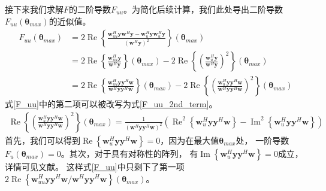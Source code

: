 \documentclass[master]{thesis-uestc}
\begin{document}
接下来我们求解$F$的二阶导数$F_{uu}$。为简化后续计算，我们此处导出二阶导数$F_{uu}(\bm{\theta}_{max})$的近似值。
\begin{equation}\label{F_uu}
    \begin{aligned}
        F_{uu}(\bm{\theta}_{max}) &= 2\operatorname{Re}
        \left\{\frac{\bm{w}^H_{uu}\bm{y}\bm{w}^H\bm{y}-\bm{w}^H_u\bm{y}\bm{w}^H_u\bm{y}}
        {\left( \bm{w}^H\bm{y} \right)^2}\right\}(\bm{\theta}_{max}) \\
        &= 2\operatorname{Re}\left\{\frac{\bm{w}^H_{uu}\bm{y}}{\bm{w}^H\bm{y}}\right\}(\bm{\theta}_{max}) - 
           2\operatorname{Re}\left\{\left(\frac{\bm{w}^H_{u}\bm{y}}{\bm{w}^H\bm{y}}\right)^2\right\}(\bm{\theta}_{max})
           \\
        &= 2\operatorname{Re}\left\{\frac{\bm{w}^H_{uu}\bm{y}\bm{y}^H\bm{w}}
                                    {\bm{w}^H\bm{y}\bm{y}^H\bm{w}}\right\}(\bm{\theta}_{max}) - 
           2\operatorname{Re}\left\{\left(\frac{\bm{w}^H_{u}\bm{y}\bm{y}^H\bm{w}}
                                    {\bm{w}^H\bm{y}\bm{y}^H\bm{w}}\right)^2\right\}(\bm{\theta}_{max})
    \end{aligned}
\end{equation}
式\eqref{F_uu}中的第二项可以被改写为式\eqref{F_uu_2nd_term}。
\begin{equation}\label{F_uu_2nd_term}
    \begin{aligned}
        \operatorname{Re}\left\{\left(\frac{\bm{w}^H_{u}\bm{y}\bm{y}^H\bm{w}}
                                {\bm{w}^H\bm{y}\bm{y}^H\bm{w}}\right)^2\right\}(\bm{\theta}_{max})
        = \frac{1}{\left(\bm{w}^H\bm{y}\bm{y}^H\bm{w}\right)^2}
          \left(\operatorname{Re}^2\left\{\bm{w}^H_{u}\bm{y}\bm{y}^H\bm{w}\right\}-
          \operatorname{Im}^2\left\{\bm{w}^H_{u}\bm{y}\bm{y}^H\bm{w}\right\}\right)
    \end{aligned}
\end{equation}
首先，我们可以得到$\operatorname{Re}\left\{\bm{w}^H_{u}\bm{y}\bm{y}^H\bm{w}\right\}=0$，因为在最大值$\bm{\theta}_{max}$处，
一阶导数$F_u(\bm{\theta}_{max})=0$。其次，对于具有对称性的阵列，
有$\operatorname{Im}\left\{\bm{w}^H_{u}\bm{y}\bm{y}^H\bm{w}\right\}=0$成立，详情可见文献\cite{Nickel_93}。
这样式\eqref{F_uu}中只剩下了第一项
$2\operatorname{Re}\left\{\bm{w}^H_{uu}\bm{y}\bm{y}^H\bm{w}/\bm{w}^H\bm{y}\bm{y}^H\bm{w}\right\}(\bm{\theta}_{max})$。
\end{document}
